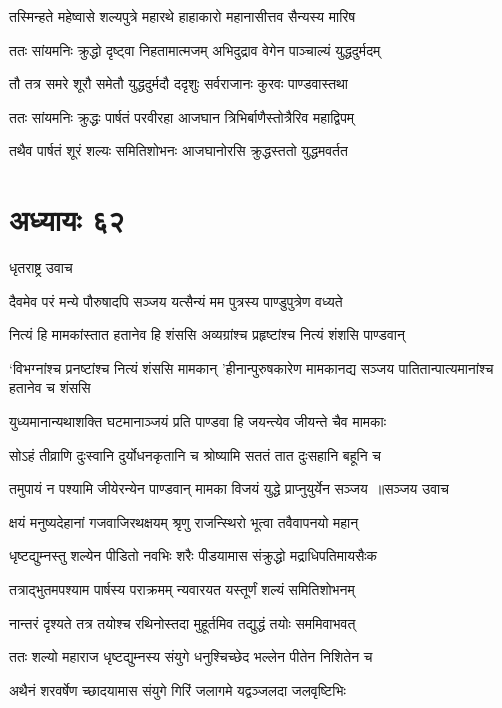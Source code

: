 \twolineshloka
{तस्मिन्हते महेष्वासे शल्यपुत्रे महारथे}
{हाहाकारो महानासीत्तव सैन्यस्य मारिष}


\twolineshloka
{ततः सांयमनिः क्रुद्धो दृष्ट्वा निहतामात्मजम्}
{अभिदुद्राव वेगेन पाञ्चाल्यं युद्धदुर्मदम्}


\twolineshloka
{तौ तत्र समरे शूरौ समेतौ युद्धदुर्मदौ}
{ददृशुः सर्वराजानः कुरवः पाण्डवास्तथा}


\twolineshloka
{ततः सांयमनिः क्रुद्धः पार्षतं परवीरहा}
{आजघान त्रिभिर्बाणैस्तोत्रैरिव महाद्विपम्}


\twolineshloka
{तथैव पार्षतं शूरं शल्यः समितिशोभनः}
{आजघानोरसि क्रुद्धस्ततो युद्धमवर्तत}


\chapter{अध्यायः ६२}
\twolineshloka
{धृतराष्ट्र उवाच}
{}


\twolineshloka
{दैवमेव परं मन्ये पौरुषादपि सञ्जय}
{यत्सैन्यं मम पुत्रस्य पाण्डुपुत्रेण वध्यते}


\twolineshloka
{नित्यं हि मामकांस्तात हतानेव हि शंससि}
{अव्यग्रांश्च प्रहृष्टांश्च नित्यं शंशसि पाण्डवान्}


\threelineshloka
{`विभग्नांश्च प्रनष्टांश्च नित्यं शंससि मामकान्}
{'हीनान्पुरुषकारेण मामकानद्य सञ्जय}
{पातितान्पात्यमानांश्च हतानेव च शंससि}


\twolineshloka
{युध्यमानान्यथाशक्ति घटमानाञ्जयं प्रति}
{पाण्डवा हि जयन्त्येव जीयन्ते चैव मामकाः}


\twolineshloka
{सोऽहं तीव्राणि दुःस्वानि दुर्योधनकृतानि च}
{श्रोष्यामि सततं तात दुःसहानि बहूनि च}


\threelineshloka
{तमुपायं न पश्यामि जीयेरन्येन पाण्डवान्}
{मामका विजयं युद्धे प्राप्नुयुर्येन सञ्जय ॥सञ्जय उवाच}
{}


\twolineshloka
{क्षयं मनुष्यदेहानां गजवाजिरथक्षयम्}
{श्रृणु राजन्स्थिरो भूत्वा तवैवापनयो महान्}


\twolineshloka
{धृष्टद्युम्नस्तु शल्येन पीडितो नवभिः शरैः}
{पीडयामास संक्रुद्धो मद्राधिपतिमायसैःक}


\twolineshloka
{तत्राद्भुतमपश्याम पार्षस्य पराक्रमम्}
{न्यवारयत यस्तूर्णं शल्यं समितिशोभनम्}


\twolineshloka
{नान्तरं दृश्यते तत्र तयोश्च रथिनोस्तदा}
{मुहूर्तमिव तद्युद्धं तयोः सममिवाभवत्}


\twolineshloka
{ततः शल्यो महाराज धृष्टद्युम्नस्य संयुगे}
{धनुश्चिच्छेद भल्लेन पीतेन निशितेन च}


\twolineshloka
{अथैनं शरवर्षेण च्छादयामास संयुगे}
{गिरिं जलागमे यद्वञ्जलदा जलवृष्टिभिः}



